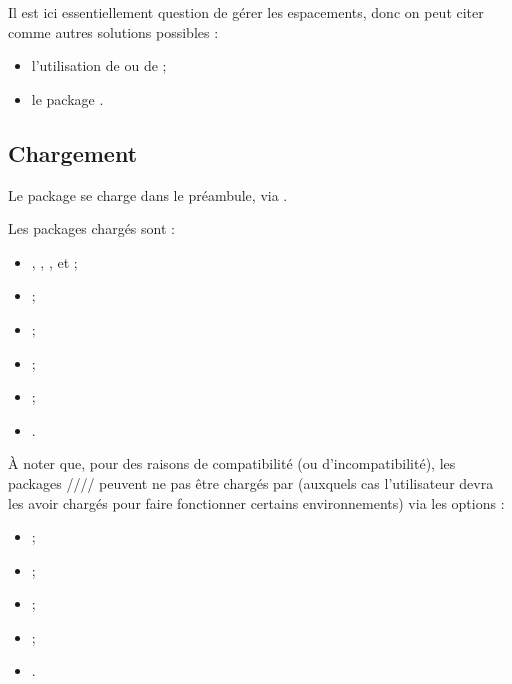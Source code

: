 \documentclass[french,11pt,a4paper]{article}
\begin{document}
\smallskip

Il est ici essentiellement question de gérer les espacements, donc on peut citer comme autres solutions possibles :

\begin{itemize}
	\item l'utilisation de  ou de  ;
	\item le package .
\end{itemize}

\subsection{Chargement}

Le package se charge dans le préambule, via .

Les packages chargés sont :

\begin{itemize}
	\item {}, , ,  et  ;
	\item {} ;
	\item {} ;
	\item {} ;
	\item {} ;
	\item {}.
\end{itemize}

À noter que, pour des raisons de compatibilité (ou d'incompatibilité), les packages //// peuvent ne pas être chargés par  (auxquels cas l'utilisateur devra les avoir chargés pour faire fonctionner certains environnements) via les options :

\begin{itemize}
	\item {} ;
	\item {} ;
	\item {} ;
	\item {} ;
	\item {}.
\end{itemize}
\end{document}
